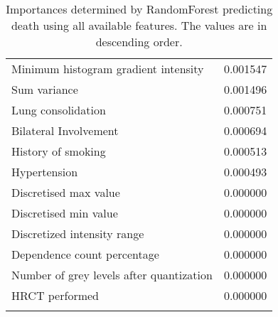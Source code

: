 \begin{longtable}{|lr|}
Minimum histogram gradient intensity               &        0.001547 \\
Sum variance                                       &        0.001496 \\
Lung consolidation                                 &        0.000751 \\
Bilateral Involvement                              &        0.000694 \\
History of smoking                                 &        0.000513 \\
Hypertension                                       &        0.000493 \\
Discretised max value                              &        0.000000 \\
Discretised min value                              &        0.000000 \\
Discretized intensity range                        &        0.000000 \\
Dependence count percentage                        &        0.000000 \\
Number of grey levels after quantization           &        0.000000 \\
HRCT performed                                     &        0.000000 \\
\bottomrule
\caption{Importances determined by RandomForest predicting death using all available features. The values are in descending order.} %
\label{tab:RFimpoAllDeath}
\end{longtable}

